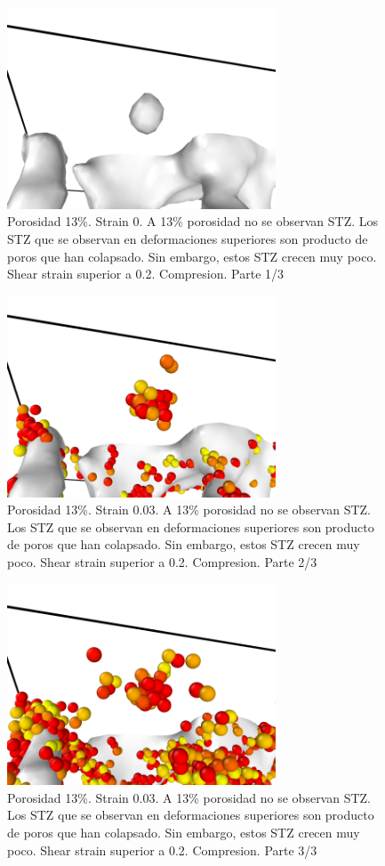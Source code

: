 \documentclass[10pt, oneside]{article} %
\begin{document}
\begin{figure}[H]
\centering
\includegraphics[width=8cm]{Figures/Porosidad/porosidad_13_shearstrain_poro_0.png}
\caption{Porosidad 13\%. Strain 0. A 13\% porosidad no se observan STZ. Los STZ que se observan en deformaciones superiores son producto de poros que han colapsado. Sin embargo, estos STZ crecen muy poco. Shear strain superior a 0.2. Compresion. Parte 1/3}
\end{figure}

\begin{figure}[H]
\centering
\includegraphics[width=8cm]{Figures/Porosidad/porosidad_13_shearstrain_poro_001.png}
\caption{Porosidad 13\%. Strain 0.03. A 13\% porosidad no se observan STZ. Los STZ que se observan en deformaciones superiores son producto de poros que han colapsado. Sin embargo, estos STZ crecen muy poco. Shear strain superior a 0.2. Compresion. Parte 2/3}
\end{figure}

\begin{figure}[H]
\centering
\includegraphics[width=8cm]{Figures/Porosidad/porosidad_13_shearstrain_poro_003.png}
\caption{Porosidad 13\%. Strain 0.03. A 13\% porosidad no se observan STZ. Los STZ que se observan en deformaciones superiores son producto de poros que han colapsado. Sin embargo, estos STZ crecen muy poco. Shear strain superior a 0.2. Compresion. Parte 3/3}
\end{figure}
\end{document}
